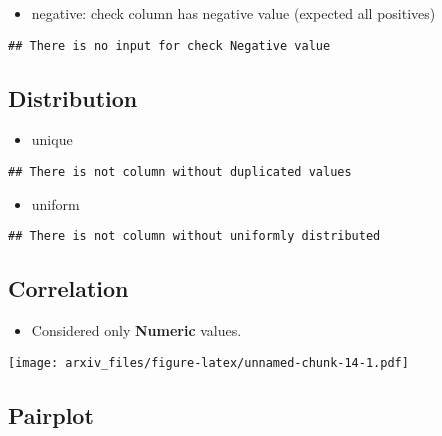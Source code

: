 \documentclass{article}
\providecommand{\tightlist}{%
  \setlength{\itemsep}{0pt}\setlength{\parskip}{0pt}}
\begin{document}
\begin{itemize}
\tightlist
\item
  negative: check column has negative value (expected all positives)
\end{itemize}

\begin{verbatim}
## There is no input for check Negative value
\end{verbatim}

\newpage

\hypertarget{distribution}{%
\subsection{Distribution}\label{distribution}}

\begin{itemize}
\tightlist
\item
  unique
\end{itemize}

\begin{verbatim}
## There is not column without duplicated values
\end{verbatim}

\begin{itemize}
\tightlist
\item
  uniform
\end{itemize}

\begin{verbatim}
## There is not column without uniformly distributed
\end{verbatim}

\newpage

\hypertarget{correlation}{%
\subsection{Correlation}\label{correlation}}

\begin{itemize}
\tightlist
\item
  Considered only \textbf{Numeric} values.
\end{itemize}

\texttt{[image: arxiv\_files/figure-latex/unnamed-chunk-14-1.pdf]}

\newpage

\hypertarget{pairplot}{%
\subsection{Pairplot}\label{pairplot}}
\end{document}
